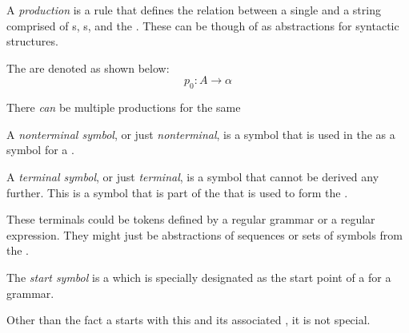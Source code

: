 \begin{definition}[Production]\label{def:Production}
  A \emph{production} is a rule that defines the relation between a single  and a string comprised of s, s, and the .
  These can be though of as abstractions for syntactic structures.

  The are denoted as shown below:
  \begin{equation}\label{eq:Production}
    p_{0}: A \rightarrow \alpha
  \end{equation}

  \begin{remark}
    There \emph{can} be multiple productions for the same 
  \end{remark}
\end{definition}

\begin{definition}\label{def:Nonterminal_Symbol}
  A \emph{nonterminal symbol}, or just \emph{nonterminal}, is a symbol that is used in the  as a symbol for a .
\end{definition}

\begin{definition}\label{def:Terminal_Symbol}
  A \emph{terminal symbol}, or just \emph{terminal}, is a symbol that cannot be derived any further.
  This is a symbol that is part of the  that is used to form the .

  \begin{remark}
    These terminals could be tokens defined by a regular grammar or a regular expression.
    They might just be abstractions of sequences or sets of symbols from the .
  \end{remark}
\end{definition}

\begin{definition}\label{def:Start_Symbol}
  The \emph{start symbol} is a  which is specially designated as the start point of a  for a grammar.

  Other than the fact a  starts with this  and its associated , it is not special.
\end{definition}

